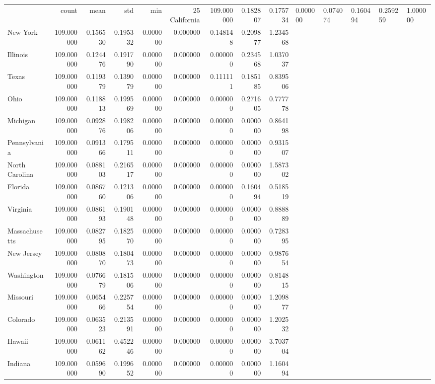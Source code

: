 \begin{tabular}{lrrrrrrrr}
\toprule
 & count & mean & std & min & 25%
\midrule
California & 109.000000 & 0.182807 & 0.175734 & 0.000000 & 0.074074 & 0.160494 & 0.259259 & 1.000000 \\
New York & 109.000000 & 0.156530 & 0.195332 & 0.000000 & 0.000000 & 0.148148 & 0.209877 & 1.234568 \\
Illinois & 109.000000 & 0.124476 & 0.191790 & 0.000000 & 0.000000 & 0.000000 & 0.234568 & 1.037037 \\
Texas & 109.000000 & 0.119379 & 0.139079 & 0.000000 & 0.000000 & 0.111111 & 0.185185 & 0.839506 \\
Ohio & 109.000000 & 0.118813 & 0.199569 & 0.000000 & 0.000000 & 0.000000 & 0.271605 & 0.777778 \\
Michigan & 109.000000 & 0.092876 & 0.198206 & 0.000000 & 0.000000 & 0.000000 & 0.000000 & 0.864198 \\
Pennsylvania & 109.000000 & 0.091366 & 0.179511 & 0.000000 & 0.000000 & 0.000000 & 0.000000 & 0.931507 \\
North Carolina & 109.000000 & 0.088103 & 0.216517 & 0.000000 & 0.000000 & 0.000000 & 0.000000 & 1.587302 \\
Florida & 109.000000 & 0.086760 & 0.121306 & 0.000000 & 0.000000 & 0.000000 & 0.160494 & 0.518519 \\
Virginia & 109.000000 & 0.086193 & 0.190148 & 0.000000 & 0.000000 & 0.000000 & 0.000000 & 0.888889 \\
Massachusetts & 109.000000 & 0.082795 & 0.182570 & 0.000000 & 0.000000 & 0.000000 & 0.000000 & 0.728395 \\
New Jersey & 109.000000 & 0.080870 & 0.180473 & 0.000000 & 0.000000 & 0.000000 & 0.000000 & 0.987654 \\
Washington & 109.000000 & 0.076679 & 0.181506 & 0.000000 & 0.000000 & 0.000000 & 0.000000 & 0.814815 \\
Missouri & 109.000000 & 0.065466 & 0.225754 & 0.000000 & 0.000000 & 0.000000 & 0.000000 & 1.209877 \\
Colorado & 109.000000 & 0.063523 & 0.213591 & 0.000000 & 0.000000 & 0.000000 & 0.000000 & 1.202532 \\
Hawaii & 109.000000 & 0.061162 & 0.452246 & 0.000000 & 0.000000 & 0.000000 & 0.000000 & 3.703704 \\
Indiana & 109.000000 & 0.059690 & 0.199652 & 0.000000 & 0.000000 & 0.000000 & 0.000000 & 1.160494 \\

\end{tabular}
